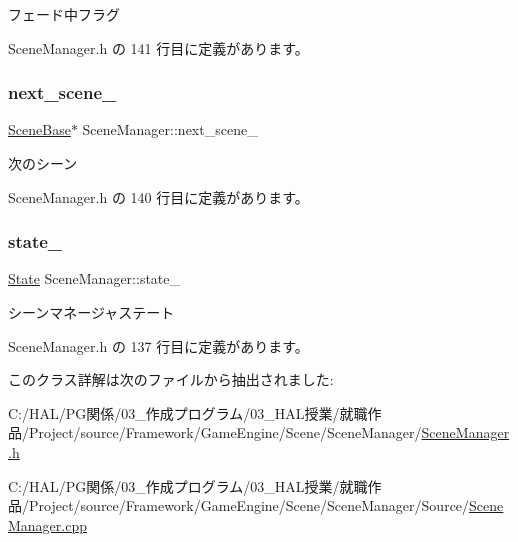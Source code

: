 フェード中フラグ 



 Scene\+Manager.\+h の 141 行目に定義があります。

\mbox{\label{class_scene_manager_a7f9bb649125a114715b07154ac3df6ae}} 
\subsubsection{\texorpdfstring{next\+\_\+scene\+\_\+}{next\_scene\_}}
{\footnotesize\ttfamily \mbox{\hyperlink{class_scene_base}{Scene\+Base}}$\ast$ Scene\+Manager\+::next\+\_\+scene\+\_\+\hspace{0.3cm}{\ttfamily [private]}}



次のシーン 



 Scene\+Manager.\+h の 140 行目に定義があります。

\mbox{\label{class_scene_manager_adf81d8a63dee92bfe5bb934903542bec}} 
\subsubsection{\texorpdfstring{state\+\_\+}{state\_}}
{\footnotesize\ttfamily \mbox{\hyperlink{class_scene_manager_a68d32794fe1ce945c6a6c380c11a08eb}{State}} Scene\+Manager\+::state\+\_\+\hspace{0.3cm}{\ttfamily [private]}}



シーンマネージャステート 



 Scene\+Manager.\+h の 137 行目に定義があります。



このクラス詳解は次のファイルから抽出されました\+:\begin{DoxyCompactItemize}
\item 
C\+:/\+H\+A\+L/\+P\+G関係/03\+\_\+作成プログラム/03\+\_\+\+H\+A\+L授業/就職作品/\+Project/source/\+Framework/\+Game\+Engine/\+Scene/\+Scene\+Manager/\mbox{\hyperlink{_scene_manager_8h}{Scene\+Manager.\+h}}\item 
C\+:/\+H\+A\+L/\+P\+G関係/03\+\_\+作成プログラム/03\+\_\+\+H\+A\+L授業/就職作品/\+Project/source/\+Framework/\+Game\+Engine/\+Scene/\+Scene\+Manager/\+Source/\mbox{\hyperlink{_scene_manager_8cpp}{Scene\+Manager.\+cpp}}\end{DoxyCompactItemize}
